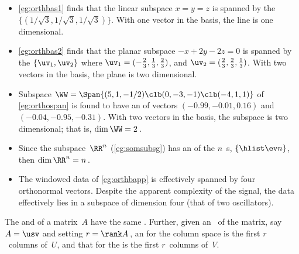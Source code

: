 \begin{example} 
\begin{itemize}
\item \cref{eg:orthbas1} finds that the linear subspace \(x=y=z\) is spanned by the  \(\{(1/{\sqrt3},1/{\sqrt3},1/{\sqrt3})\}\).  
With one vector in the basis, the line is one dimensional.

\item \cref{eg:orthbas2} finds that the planar subspace \(-x+2y-2z=0\) is spanned by the  \(\{\uv_1,\uv_2\}\) where \(\uv_1=(-\frac23,\frac13,\frac23)\), and \(\uv_2=(\frac23,\frac23,\frac13)\).  
With two vectors in the basis, the plane is two dimensional.

\item  Subspace \(\WW=\Span\{(5,1,-1/2)\clb (0,-3,-1)\clb (-4,1,1)\}\) of \cref{eg:orthospan} is found to have an  of  vectors  \((-0.99,-0.01,0.16)\) and \((-0.04,-0.95,-0.31)\).
With two vectors in the basis, the subspace is two dimensional; that is, \(\dim\WW=2\)\,.

\item Since the subspace~\(\RR^n\) (\cref{eg:somsubsg}) has an  of the \(n\)~s, \(\{\hlist\ev n\}\), then  \(\dim\RR^n=n\)\,.

\item The  windowed data of \cref{eg:orthbapp} is effectively spanned by four orthonormal vectors.  Despite the apparent complexity of the signal, the data effectively lies in a subspace of dimension four (that of two oscillators).
\end{itemize}
\end{example}


\begin{theorem} \label{thm:rowcolD} 
The  and  of a matrix~\(A\) have the same .
Further, given an \svd\ of the matrix, say \(A=\usv\) and setting \(r=\rank A\)\,, an  for the column space is the first \(r\)~columns of~\(U\), and that for the  is the first \(r\)~columns of~\(V\).
\end{theorem}

